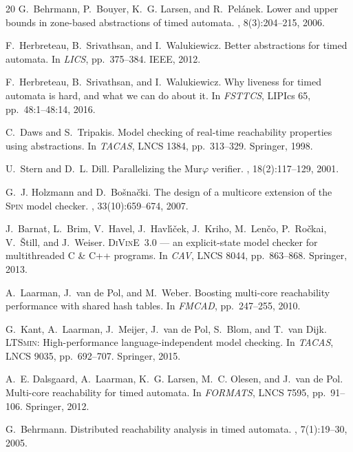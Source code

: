 \documentclass[runningheads]{llncs}
\begin{document}
\begin{thebibliography}{20}
G.~Behrmann, P.~Bouyer, K.~G. Larsen, and R.~Pel{\'a}nek.
\newblock Lower and upper bounds in zone-based abstractions of timed automata.
, 8(3):204--215, 2006.

F.~Herbreteau, B.~Srivathsan, and I.~Walukiewicz.
\newblock Better abstractions for timed automata.
\newblock In {\em LICS}, pp.~375--384. IEEE, 2012.

F.~Herbreteau, B.~Srivathsan, and I.~Walukiewicz.
\newblock Why liveness for timed automata is hard, and what we can do about it.
\newblock In {\em FSTTCS}, LIPIcs 65, pp.~48:1--48:14, 2016.

C.~Daws and S.~Tripakis.
\newblock Model checking of real-time reachability properties using
  abstractions.
\newblock In {\em TACAS}, LNCS 1384, pp.~313--329. Springer, 1998.

U.~Stern and D.~L. Dill.
\newblock Parallelizing the Mur$\varphi$ verifier.
, 18(2):117--129, 2001.

G.~J. Holzmann and D.~Bo{\v s}na{\v c}ki.
\newblock The design of a multicore extension of the \textsc{Spin} model
  checker.
, 33(10):659--674, 2007.

J.~Barnat, L.~Brim, V.~Havel, J.~Havl{\'\i}{\v c}ek, J.~Kriho, M.~Len{\v c}o,
  P.~Ro{\v c}kai, V.~{\v S}till, and J.~Weiser.
\newblock \textsc{DiVinE}~3.0 --- an explicit-state model checker for
  multithreaded C \& C++ programs.
\newblock In {\em CAV}, LNCS 8044, pp.~863--868. Springer, 2013.

A.~Laarman, J.~van de Pol, and M.~Weber.
\newblock Boosting multi-core reachability performance with shared hash tables.
\newblock In {\em FMCAD}, pp.~247--255, 2010.

G.~Kant, A.~Laarman, J.~Meijer, J.~van de Pol, S.~Blom, and T.~van Dijk.
\newblock \textsc{LTSmin}: High-performance language-independent model
  checking.
\newblock In {\em TACAS}, LNCS 9035, pp.~692--707. Springer, 2015.

A.~E. Dalsgaard, A.~Laarman, K.~G. Larsen, M.~C. Olesen, and J.~van de Pol.
\newblock Multi-core reachability for timed automata.
\newblock In {\em FORMATS}, LNCS 7595, pp.~91--106. Springer, 2012.

G.~Behrmann.
\newblock Distributed reachability analysis in timed automata.
, 7(1):19--30, 2005.


\end{thebibliography}
\end{document}
